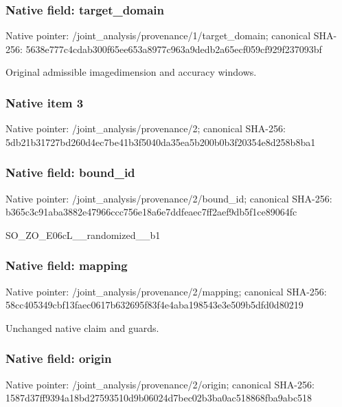 \documentclass[10pt,a4paper]{article}
\begin{document}
\subsubsection{Native field: target\_domain}


Native pointer: /joint\_analysis/provenan\allowbreak{}ce/1/target\_domain; canonical SHA-256: 5638e777c4cdab300f65ee65\allowbreak{}3a8977c963a9dedb2a65ecf0\allowbreak{}59cf929f237093bf


Original admissible imagedimension and accuracy windows.


\subsubsection{Native item 3}


Native pointer: /joint\_analysis/provenance/2; canonical SHA-256: 5db21b31727bd260d4ec7be4\allowbreak{}1b3f5040da35ea5b200b0b3f\allowbreak{}20354e8d258b8ba1



\subsubsection{Native field: bound\_id}


Native pointer: /joint\_analysis/provenance/2/bound\_id; canonical SHA-256: b365c3c91aba3882e47966cc\allowbreak{}c756e18a6e7ddfeaec7ff2ae\allowbreak{}f9db5f1ce89064fc


SO\_ZO\_E06cL\_\_randomized\_\_b1


\subsubsection{Native field: mapping}


Native pointer: /joint\_analysis/provenance/2/mapping; canonical SHA-256: 58cc405349cbf13faec0617b\allowbreak{}632695f83f4e4aba198543e3\allowbreak{}e509b5dfd0d80219


Unchanged native claim and guards.


\subsubsection{Native field: origin}


Native pointer: /joint\_analysis/provenance/2/origin; canonical SHA-256: 1587d37ff9394a18bd275935\allowbreak{}10d9b06024d7bec02b3ba0ac\allowbreak{}518868fba9abc518
\end{document}
